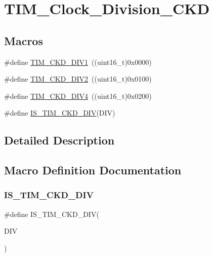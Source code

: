 \hypertarget{group___t_i_m___clock___division___c_k_d}{}\section{T\+I\+M\+\_\+\+Clock\+\_\+\+Division\+\_\+\+C\+KD}
\label{group___t_i_m___clock___division___c_k_d}
\subsection*{Macros}
\begin{DoxyCompactItemize}
\item 
\#define \mbox{\hyperlink{group___t_i_m___clock___division___c_k_d_ga88691a07b3976791977d280045b3c850}{T\+I\+M\+\_\+\+C\+K\+D\+\_\+\+D\+I\+V1}}~((uint16\+\_\+t)0x0000)
\item 
\#define \mbox{\hyperlink{group___t_i_m___clock___division___c_k_d_ga46a5fd6a173a7e88528a6e4084a08665}{T\+I\+M\+\_\+\+C\+K\+D\+\_\+\+D\+I\+V2}}~((uint16\+\_\+t)0x0100)
\item 
\#define \mbox{\hyperlink{group___t_i_m___clock___division___c_k_d_gac2e5c030f964f9b4c92fa8129fb923bc}{T\+I\+M\+\_\+\+C\+K\+D\+\_\+\+D\+I\+V4}}~((uint16\+\_\+t)0x0200)
\item 
\#define \mbox{\hyperlink{group___t_i_m___clock___division___c_k_d_ga9298ec9ad2d578a4c54e6c0dd4c03946}{I\+S\+\_\+\+T\+I\+M\+\_\+\+C\+K\+D\+\_\+\+D\+IV}}(D\+IV)
\end{DoxyCompactItemize}


\subsection{Detailed Description}


\subsection{Macro Definition Documentation}
\mbox{\label{group___t_i_m___clock___division___c_k_d_ga9298ec9ad2d578a4c54e6c0dd4c03946}} 
\subsubsection{\texorpdfstring{IS\_TIM\_CKD\_DIV}{IS\_TIM\_CKD\_DIV}}
{\footnotesize\ttfamily \#define I\+S\+\_\+\+T\+I\+M\+\_\+\+C\+K\+D\+\_\+\+D\+IV(\begin{DoxyParamCaption}\item[{}]{D\+IV }\end{DoxyParamCaption})}


